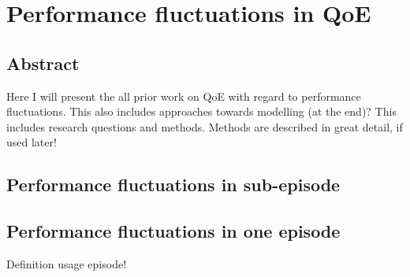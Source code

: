 \chapter{Performance fluctuations in QoE}\label{chap:04}
\section*{Abstract}
Here I will present the all prior work on QoE with regard to performance fluctuations.
This also includes approaches towards modelling (at the end)?
This includes research questions and methods.
Methods are described in great detail, if used later!

\section{Performance fluctuations in sub-episode}

\section{Performance fluctuations in one episode}

Definition usage episode!